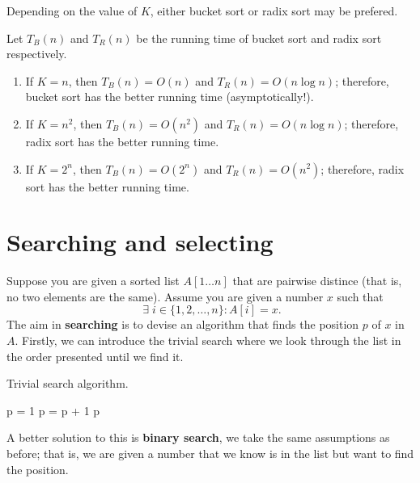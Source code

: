 Depending on the value of $K$, either bucket sort or radix sort may be prefered.
\begin{example}
    Let $T_{B}(n)$ and $T_{R}(n)$ be the running time of bucket sort and radix sort respectively.
    \begin{enumerate}
        \item If $K = n$, then $T_{B}(n)=O(n)$ and $T_{R}(n)=O(n \log{n})$; therefore, bucket sort has the better running time (asymptotically!).
        \item If $K = n^2$, then $T_{B}(n)=O(n^2)$ and $T_{R}(n)=O(n \log{n})$; therefore, radix sort has the better running time.
        \item If $K = 2^n$, then $T_{B}(n)=O(2^n)$ and $T_{R}(n)=O(n^2)$; therefore, radix sort has the better running time.
    \end{enumerate}
\end{example}

\section{Searching and selecting}

Suppose you are given a sorted list $A[1 \ldots n]$ that are pairwise distince (that is, no two elements are the same). Assume you are given a number $x$ such that \[ \; \exists \; i \in \{ 1, 2, \ldots, n \} : A[i] = x. \] The aim in \textbf{searching} is to devise an algorithm that finds the position $p$ of $x$ in $A$. Firstly, we can introduce the trivial search where we look through the list in the order presented until we find it.

\begin{algorithm}
    \caption{Trivial search algorithm.}
    \label{alg:trivial_search}
    \begin{algorithmic}[1]
            \State p = 1
                \State p = p + 1
            \EndWhile
            \State \Return p
        \EndProcedure
    \end{algorithmic}
\end{algorithm}

A better solution to this is \textbf{binary search}, we take the same assumptions as before; that is, we are given a number that we know is in the list but want to find the position.

